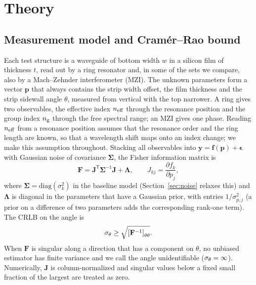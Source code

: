 \section{Theory}
\label{sec:theory}

\subsection{Measurement model and Cram\'er--Rao bound}

Each test structure is a waveguide of bottom width $w$ in a silicon film of thickness $t$, read out by a ring
resonator and, in some of the sets we compare, also by a Mach--Zehnder interferometer (MZI). The unknown parameters form a vector $\mathbf{p}$ that always
contains the strip width offset, the film thickness and the strip sidewall angle $\theta$, measured from vertical
with the top narrower. A ring gives two observables, the effective index $n_\mathrm{eff}$ through the resonance position and
the group index $n_\mathrm{g}$ through the free spectral range; an MZI gives one phase. Reading $n_\mathrm{eff}$ from a resonance
position assumes that the resonance order and the ring length are known, so that a wavelength shift maps onto an index
change; we make this assumption throughout. Stacking all observables into
$\mathbf{y}=\mathbf{f}(\mathbf{p})+\boldsymbol{\epsilon}$ with Gaussian noise of covariance
$\boldsymbol{\Sigma}$, the Fisher information matrix is
\begin{equation}
\mathbf{F}=\mathbf{J}^{\mathsf T}\boldsymbol{\Sigma}^{-1}\mathbf{J}+\boldsymbol{\Lambda},\qquad
J_{kj}=\frac{\partial f_k}{\partial p_j},
\label{eq:fisher}
\end{equation}
where $\boldsymbol{\Sigma}=\mathrm{diag}(\sigma_k^2)$ in the baseline model (Section~\ref{sec:noise}
relaxes this) and $\boldsymbol{\Lambda}$ is diagonal in the parameters that
have a Gaussian prior, with entries $1/\sigma_{p,j}^2$ (a prior on a difference of two parameters adds the
corresponding rank-one term). The CRLB on the angle is~\cite{kay1993}
\begin{equation}
\sigma_\theta\ge\sqrt{\left[\mathbf{F}^{-1}\right]_{\theta\theta}}.
\label{eq:crlb}
\end{equation}
When $\mathbf{F}$ is singular along a direction that has a component on $\theta$, no unbiased estimator has finite
variance and we call the angle unidentifiable ($\sigma_\theta=\infty$). Numerically, $\mathbf{J}$ is column-normalized and
singular values below a fixed small fraction of the largest are treated as zero.

